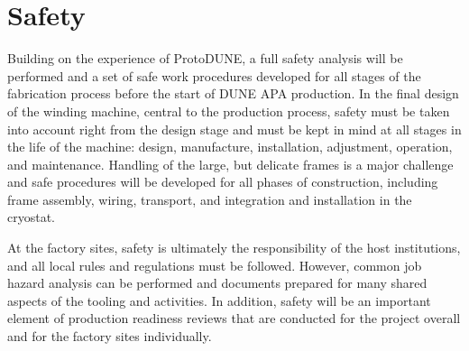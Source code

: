 \section{Safety}
\label{sec:fdsp-apa-safety}

Building on the experience of ProtoDUNE, a full safety analysis will be performed and a set of safe work procedures developed for all stages of the fabrication process before the start of DUNE APA production.  In the final design of the winding machine, central to the production process, safety must be taken into account right from the design stage and must be kept in mind at all stages in the life of the machine: design, manufacture, installation, adjustment, operation, and maintenance.  Handling of the large, but delicate frames is a major challenge and safe procedures will be developed for all phases of construction, including frame assembly, wiring, transport, and integration and installation in the cryostat.         

At the factory sites, safety is ultimately the responsibility of the host institutions, and all local rules and regulations must be followed.  However, common job hazard analysis can be performed and documents prepared for many shared aspects of the tooling and activities.  In addition, safety will be an important element of production readiness reviews that are conducted for the project overall and for the factory sites individually.   